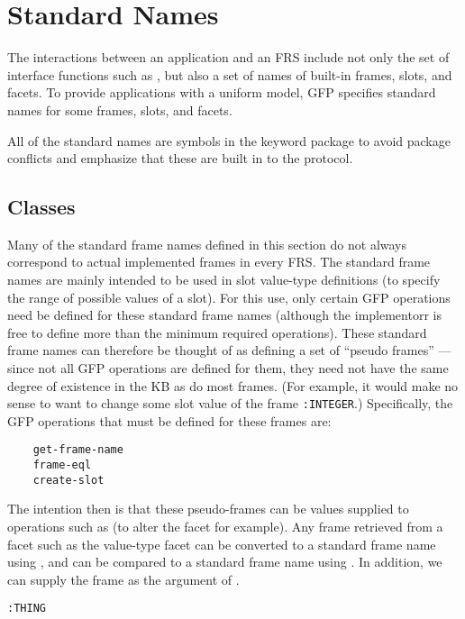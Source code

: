 \chapter{Standard Names}


The interactions between an application and an FRS include not only
the set of interface functions such as , but also
a set of names of built-in frames, slots, and facets.  To provide
applications with a uniform model, GFP specifies standard names for
some frames, slots, and facets. 

All of the standard names are symbols in the keyword package to avoid
package conflicts and emphasize that these are built in to the
protocol.


\section{Classes}

Many of the standard frame names defined in this section do not always
correspond to actual implemented frames in every FRS.  The standard
frame names are mainly intended to be used in slot value-type
definitions (to specify the range of possible values of a slot).  For
this use, only certain GFP operations need be defined for these
standard frame names (although the implementorr is free to define more
than the minimum required operations).  These standard frame names can
therefore be thought of as defining a set of ``pseudo frames'' ---
since not all GFP operations are defined for them, they need not have
the same degree of existence in the KB as do most frames.  (For
example, it would make no sense to want to change some slot value of
the frame {\tt :INTEGER}.)  Specifically, the GFP operations that must
be defined for these frames are:

\begin{verbatim}
    get-frame-name
    frame-eql
    create-slot
\end{verbatim}

The intention then is that these pseudo-frames can be values
supplied to operations such as  (to alter
the  facet for example).  Any frame 
retrieved from a facet such as the value-type facet can be
converted to a standard frame name using ,
and can be compared to a standard frame name using .
In addition, we can supply the frame  as the
 argument of .


{\tt :THING}

